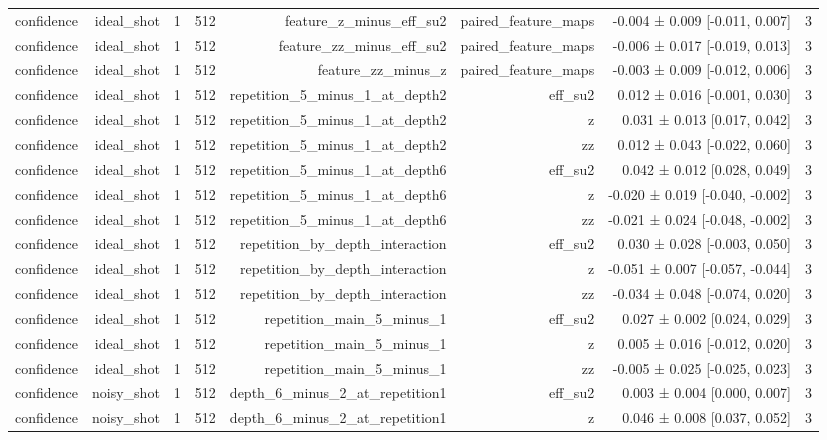 \begin{table}
\begin{tabular}{lrrrrrrr}
confidence & ideal\_shot & 1 & 512 & feature\_z\_minus\_eff\_su2 & paired\_feature\_maps & -0.004 ± 0.009 [-0.011, 0.007] & 3 \\
confidence & ideal\_shot & 1 & 512 & feature\_zz\_minus\_eff\_su2 & paired\_feature\_maps & -0.006 ± 0.017 [-0.019, 0.013] & 3 \\
confidence & ideal\_shot & 1 & 512 & feature\_zz\_minus\_z & paired\_feature\_maps & -0.003 ± 0.009 [-0.012, 0.006] & 3 \\
confidence & ideal\_shot & 1 & 512 & repetition\_5\_minus\_1\_at\_depth2 & eff\_su2 & 0.012 ± 0.016 [-0.001, 0.030] & 3 \\
confidence & ideal\_shot & 1 & 512 & repetition\_5\_minus\_1\_at\_depth2 & z & 0.031 ± 0.013 [0.017, 0.042] & 3 \\
confidence & ideal\_shot & 1 & 512 & repetition\_5\_minus\_1\_at\_depth2 & zz & 0.012 ± 0.043 [-0.022, 0.060] & 3 \\
confidence & ideal\_shot & 1 & 512 & repetition\_5\_minus\_1\_at\_depth6 & eff\_su2 & 0.042 ± 0.012 [0.028, 0.049] & 3 \\
confidence & ideal\_shot & 1 & 512 & repetition\_5\_minus\_1\_at\_depth6 & z & -0.020 ± 0.019 [-0.040, -0.002] & 3 \\
confidence & ideal\_shot & 1 & 512 & repetition\_5\_minus\_1\_at\_depth6 & zz & -0.021 ± 0.024 [-0.048, -0.002] & 3 \\
confidence & ideal\_shot & 1 & 512 & repetition\_by\_depth\_interaction & eff\_su2 & 0.030 ± 0.028 [-0.003, 0.050] & 3 \\
confidence & ideal\_shot & 1 & 512 & repetition\_by\_depth\_interaction & z & -0.051 ± 0.007 [-0.057, -0.044] & 3 \\
confidence & ideal\_shot & 1 & 512 & repetition\_by\_depth\_interaction & zz & -0.034 ± 0.048 [-0.074, 0.020] & 3 \\
confidence & ideal\_shot & 1 & 512 & repetition\_main\_5\_minus\_1 & eff\_su2 & 0.027 ± 0.002 [0.024, 0.029] & 3 \\
confidence & ideal\_shot & 1 & 512 & repetition\_main\_5\_minus\_1 & z & 0.005 ± 0.016 [-0.012, 0.020] & 3 \\
confidence & ideal\_shot & 1 & 512 & repetition\_main\_5\_minus\_1 & zz & -0.005 ± 0.025 [-0.025, 0.023] & 3 \\
confidence & noisy\_shot & 1 & 512 & depth\_6\_minus\_2\_at\_repetition1 & eff\_su2 & 0.003 ± 0.004 [0.000, 0.007] & 3 \\
confidence & noisy\_shot & 1 & 512 & depth\_6\_minus\_2\_at\_repetition1 & z & 0.046 ± 0.008 [0.037, 0.052] & 3 \\

\end{tabular}
\end{table}
